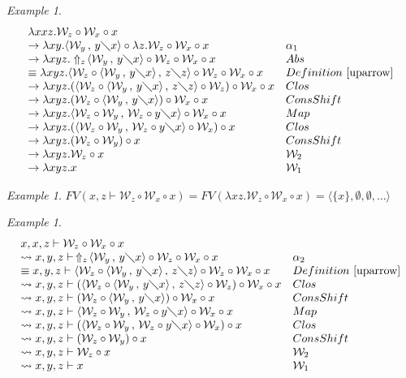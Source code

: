 \documentclass[11pt]{amsart}
\theoremstyle{plain}
\theoremstyle{definition}
\theoremstyle{remark}
\newtheorem{example}[theorem]{Example}
\numberwithin{equation}{section}
\newcommand{\ci}{\circ}
\newcommand{\ri}{\rightsquigarrow}
\newcommand{\mi}{\,,\,}
\newcommand{\is}{\diagdown}
\newcommand{\arrow}{\rightarrow}
\newcommand{\la}{\langle}
\newcommand{\ra}{\rangle}
\renewcommand{\pi}{\mathcal{W}}
\begin{document}
\begin{example}$$\begin{array}{ll}
\lambda x x z.\pi_z\ci\pi_x\ci x & \\
\arrow \lambda x y.\la\pi_y\mi y\is
x\ra\ci\lambda z.\pi_z\ci\pi_x\ci x & \alpha_1\\
\arrow
 \lambda x y
z.\Uparrow_z\!\la\pi_y\mi y\is x\ra\ci\pi_z\ci\pi_x\ci x & Abs\\
\equiv\lambda x y z.\la\pi_z\ci\la\pi_y\mi y\is x\ra\mi z\is
z\ra\ci\pi_z\ci\pi_x\ci x & Definition~\ref{uparrow}\\
\arrow \lambda x y z.(\la\pi_z\ci\la\pi_y\mi y\is x\ra\mi z\is
z\ra\ci\pi_z)\ci\pi_x\ci x & Clos\\
\arrow
\lambda x y z.(\pi_z\ci\la\pi_y\mi y\is x\ra)\ci\pi_x\ci x & ConsShift\\
\arrow
\lambda x y z.\la\pi_z\ci\pi_y\mi\pi_z\ci y\is x\ra\ci\pi_x\ci x & Map\\
\arrow
\lambda x y z.(\la\pi_z\ci\pi_y\mi\pi_z\ci y\is x\ra\ci\pi_x)\ci x & Clos\\
\arrow
\lambda x y z.(\pi_z\ci\pi_y)\ci x & ConsShift\\
\arrow
\lambda x y z.\pi_z\ci x & \pi_2\\
\arrow \lambda x y z. x & \pi_1
\end{array}$$
\end{example}
\begin{example}
$FV(x,z\vdash\pi_z\ci\pi_x\ci x)=FV(\lambda x z.\pi_z\ci\pi_x\ci
x)=\la\{x\},\emptyset,\emptyset,\ldots\ra$
\end{example}
\begin{example}$$\begin{array}{ll}
x,x,z\vdash\pi_z\ci\pi_x\ci x & \\
\ri x,y,z\vdash\,\Uparrow_z\!\la\pi_y\mi y\is
x\ra\ci\pi_z\ci\pi_x\ci x & \alpha_2\\
\equiv x,y,z\vdash\la\pi_z\ci\la\pi_y\mi y\is x\ra\mi z\is
z\ra\ci\pi_z\ci\pi_x\ci x & Definition~\ref{uparrow}\\
\ri x,y,z\vdash(\la\pi_z\ci\la\pi_y\mi y\is x\ra\mi z\is
z\ra\ci\pi_z)\ci\pi_x\ci x & Clos\\
\ri
x,y,z\vdash(\pi_z\ci\la\pi_y\mi y\is x\ra)\ci\pi_x\ci x & ConsShift\\
\ri
x,y,z\vdash\la\pi_z\ci\pi_y\mi\pi_z\ci y\is x\ra\ci\pi_x\ci x & Map\\
\ri
x,y,z\vdash(\la\pi_z\ci\pi_y\mi\pi_z\ci y\is x\ra\ci\pi_x)\ci x & Clos\\
\ri
x,y,z\vdash(\pi_z\ci\pi_y)\ci x & ConsShift\\
\ri
x,y,z\vdash\pi_z\ci x & \pi_2\\
\ri x,y,z\vdash x & \pi_1 \end{array}$$
\end{example}
\end{document}
